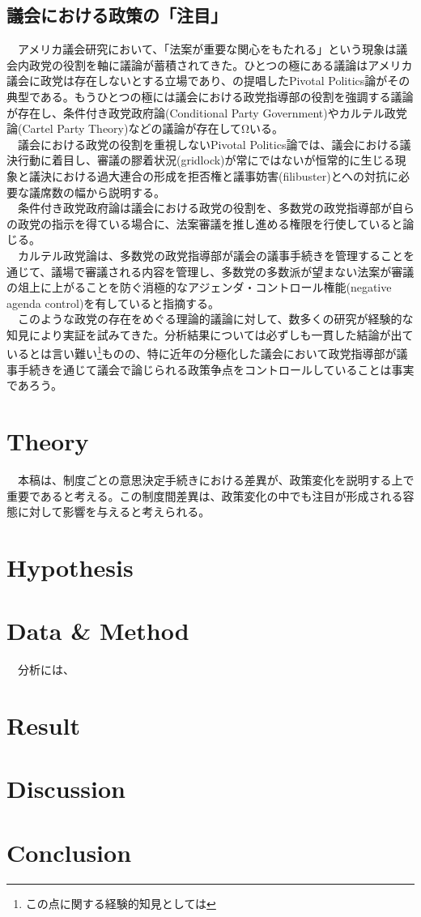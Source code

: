 \documentclass{article}
\begin{document}
\subsection{議会における政策の「注目」}
　アメリカ議会研究において、「法案が重要な関心をもたれる」という現象は議会内政党の役割を軸に議論が蓄積されてきた。ひとつの極にある議論はアメリカ議会に政党は存在しないとする立場であり、\citet*{Krehbiel2010-ob}の提唱したPivotal Politics論がその典型である。もうひとつの極には議会における政党指導部の役割を強調する議論が存在し、条件付き政党政府論(Conditional Party Government)\citep*{Rohde1991-da, Aldrich1995-xf}やカルテル政党論(Cartel Party Theory)\citep*{Cox2005-pn,Cox2007-xq}などの議論が存在してΩいる。\\
　議会における政党の役割を重視しないPivotal Politics論では、議会における議決行動に着目し、審議の膠着状況(gridlock)が常にではないが恒常的に生じる現象と議決における過大連合の形成を拒否権と議事妨害(filibuster)とへの対抗に必要な議席数の幅から説明する。\citep*{Krehbiel2010-ob}\\
　条件付き政党政府論は議会における政党の役割を、多数党の政党指導部が自らの政党の指示を得ている場合に、法案審議を推し進める権限を行使していると論じる。\\
　カルテル政党論は、多数党の政党指導部が議会の議事手続きを管理することを通じて、議場で審議される内容を管理し、多数党の多数派が望まない法案が審議の俎上に上がることを防ぐ消極的なアジェンダ・コントロール権能(negative agenda control)を有していると指摘する。\citep*{Cox2005-pn}\\
　このような政党の存在をめぐる理論的議論に対して、数多くの研究が経験的な知見により実証を試みてきた。分析結果については必ずしも一貫した結論が出ているとは言い難い\footnote{この点に関する経験的知見としては}ものの、特に近年の分極化した議会において政党指導部が議事手続きを通じて議会で論じられる政策争点をコントロールしていることは事実であろう。\citep*{Sinclair1997-jm, Sinclair2016-kh,Rosenthal2008-xb, Peters2010-ve}\\

\section*{Theory}
　本稿は、制度ごとの意思決定手続きにおける差異が、政策変化を説明する上で重要であると考える。この制度間差異は、政策変化の中でも注目が形成される容態に対して影響を与えると考えられる。
　

\section*{Hypothesis}

\section*{Data \& Method}
　分析には、

\section*{Result}

\section*{Discussion}

\section*{Conclusion}


\end{document}
